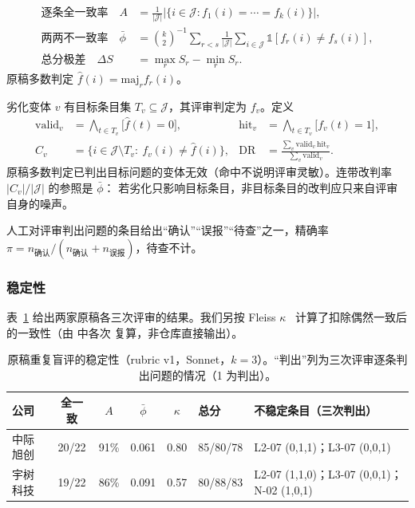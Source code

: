 \begin{definition}[稳定性指标]
\label{def:eval-stability}
\begin{align}
\text{逐条全一致率}\quad A &= \frac{1}{|\mathcal{J}|}\bigl|\{i\in\mathcal{J}: f_1(i)=\cdots=f_k(i)\}\bigr|, \\
\text{两两不一致率}\quad \bar\phi &= \binom{k}{2}^{-1}\sum_{r<s}\frac{1}{|\mathcal{J}|}\sum_{i\in\mathcal{J}}\mathbb{1}[f_r(i)\ne f_s(i)], \\
\text{总分极差}\quad \Delta S &= \max_r S_r-\min_r S_r .
\end{align}
原稿多数判定 $\hat f(i)=\mathrm{maj}_r f_r(i)$。
\end{definition}

\begin{definition}[劣化变体的命中与连带改判]
\label{def:eval-degrade}
劣化变体 $v$ 有目标条目集 $T_v\subseteq\mathcal{J}$，其评审判定为 $f_v$。定义
\begin{align}
\mathrm{valid}_v &= \bigwedge_{t\in T_v}\bigl[\hat f(t)=0\bigr], &
\mathrm{hit}_v &= \bigwedge_{t\in T_v}\bigl[f_v(t)=1\bigr],\\
C_v &= \{i\in\mathcal{J}\setminus T_v:\ f_v(i)\neq\hat f(i)\}, &
\mathrm{DR} &= \frac{\sum_{v}\mathrm{valid}_v\,\mathrm{hit}_v}{\sum_v\mathrm{valid}_v}.
\end{align}
原稿多数判定已判出目标问题的变体无效（命中不说明评审灵敏）。连带改判率 $|C_v|/|\mathcal{J}|$ 的参照是 $\bar\phi$：
若劣化只影响目标条目，非目标条目的改判应只来自评审自身的噪声。
\end{definition}

\begin{definition}[人工精确率]
\label{def:eval-precision}
人工对评审判出问题的条目给出“确认”“误报”“待查”之一，精确率 $\pi=n_{\text{确认}}/(n_{\text{确认}}+n_{\text{误报}})$，待查不计。
\end{definition}

\subsubsection{稳定性}
\label{sec:eval-calib-stability}

表~\ref{tab:eval-stability} 给出两家原稿各三次评审的结果。我们另按 Fleiss $\kappa$~\citep{fleiss1971measuring}
计算了扣除偶然一致后的一致性（由  中各次  复算，非仓库直接输出）。

\begin{table}[t]
\centering
\caption{原稿重复盲评的稳定性（rubric v1，Sonnet，$k=3$）。“判出”列为三次评审逐条判出问题的情况（1 为判出）。}
\label{tab:eval-stability}
\small
\begin{tabularx}{\linewidth}{@{}l c c c c l X@{}}
\toprule
公司 & 全一致 & $A$ & $\bar\phi$ & $\kappa$ & 总分 & 不稳定条目（三次判出） \\
\midrule
中际旭创 & 20/22 & 91\% & 0.061 & 0.80 & 85/80/78 & L2-07 (0,1,1)；L3-07 (0,0,1) \\
宇树科技 & 19/22 & 86\% & 0.091 & 0.57 & 80/88/83 & L2-07 (1,1,0)；L3-07 (0,0,1)；N-02 (1,0,1) \\
\bottomrule
\end{tabularx}
\end{table}

